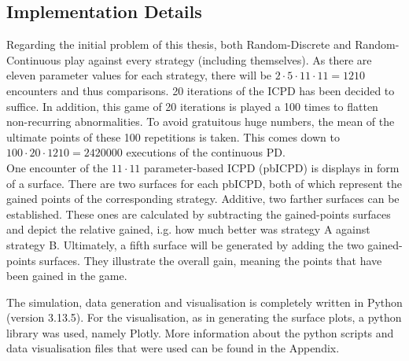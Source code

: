 \documentclass[11pt]{article}
\begin{document}
\subsection{Implementation Details}

Regarding the initial problem of this thesis, both Random-Discrete and Random-Continuous play against every strategy (including themselves).
As there are eleven parameter values for each strategy, there will be $2 \cdot 5 \cdot 11 \cdot 11 = 1210$ encounters and thus comparisons.
20 iterations of the ICPD has been decided to suffice.
In addition, this game of 20 iterations is played a 100 times to flatten non-recurring abnormalities.
To avoid gratuitous huge numbers, the mean of the ultimate points of these 100 repetitions is taken.
This comes down to $100 \cdot 20 \cdot 1210 = 2420000$ executions of the continuous PD.\\

One encounter of the $11 \cdot 11$ parameter-based ICPD (pbICPD) is displays in form of a surface.
There are two surfaces for each pbICPD, both of which represent the gained points of the corresponding strategy.
Additive, two farther surfaces can be established.
These ones are calculated by subtracting the gained-points surfaces and depict the relative gained, i.g. how much better was strategy A against strategy B.
Ultimately, a fifth surface will be generated by adding the two gained-points surfaces.
They illustrate the overall gain, meaning the points that have been gained in the game.


The simulation, data generation and visualisation is completely written in Python (version 3.13.5).
For the visualisation, as in generating the surface plots, a python library was used, namely Plotly.
More information about the python scripts and data visualisation files that were used can be found in the Appendix.

	
\end{document}
